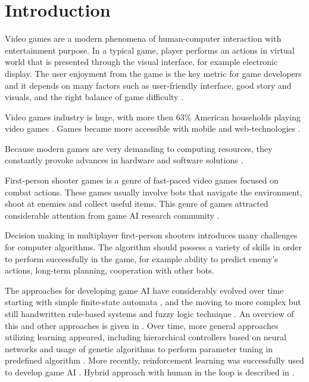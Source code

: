 \section{Introduction}

Video games are a modern phenomena of human-computer interaction with entertainment purpose.
In a typical game, player performs an actions in virtual world that is presented through the visual interface, for example electronic display.
The user enjoyment from the game is the key metric for game developers and it depends on many factors such as user-friendly interface, good story and visuals, and the right balance of game difficulty \cite{VideoGameEnjoyment}.

Video games industry is huge, with more then 63\% American households playing video games \cite{VideoGameFacts}.
Games became more accessible with mobile and web-technologies \cite{ToBeDone}.


Because modern games are very demanding to computing resources, they constantly provoke advances in hardware and software solutions \cite{ToBeDone}.

First-person shooter games is a genre of fast-paced video games focused on combat actions.
These games usually involve bots that navigate the environment, shoot at enemies and collect useful items.
This genre of games attracted considerable attention from game AI research community \cite{MLinFPS}.

Decision making in multiplayer first-person shooters introduces many challenges for computer algorithms.
The algorithm should possess a variety of skills in order to perform successfully in the game, 
for example ability to predict enemy's actions, long-term planning, cooperation with other bots.


The approaches for developing game AI have considerably evolved over time starting with simple finite-state automata \cite{ToBeDone}, and the moving to more complex but still handwritten rule-based systems \cite{RuleBased} and fuzzy logic technique \cite{FuzzyLogic}. An overview of this and other approaches is given in \cite{AITechniques}.
Over time, more general approaches utilizing learning appeared,
including hierarchical controllers based on neural networks \cite{HierarchicalController} and usage of genetic algorithms to perform parameter tuning in predefined algorithm \cite{GeneticTuning}.
More recently, reinforcement learning was successfully used to develop game AI \cite{RLGallagher}.
Hybrid approach with human in the loop is described in \cite{InteractiveGallagher}.

